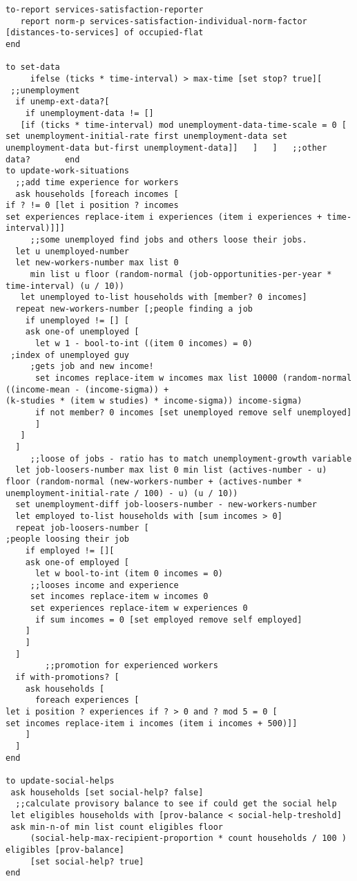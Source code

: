 \documentclass[english]{article}
\begin{document}
\begin{lstlisting}[basicstyle={\scriptsize}]
to-report services-satisfaction-reporter
   report norm-p services-satisfaction-individual-norm-factor [distances-to-services] of occupied-flat
end

to set-data
     ifelse (ticks * time-interval) > max-time [set stop? true][ 
 ;;unemployment
  if unemp-ext-data?[
    if unemployment-data != [] 
   [if (ticks * time-interval) mod unemployment-data-time-scale = 0 [
set unemployment-initial-rate first unemployment-data set unemployment-data but-first unemployment-data]]   ]   ]   ;;other data?       end
to update-work-situations
  ;;add time experience for workers
  ask households [foreach incomes [
if ? != 0 [let i position ? incomes
set experiences replace-item i experiences (item i experiences + time-interval)]]]
     ;;some unemployed find jobs and others loose their jobs.
  let u unemployed-number
  let new-workers-number max list 0 
     min list u floor (random-normal (job-opportunities-per-year * time-interval) (u / 10))
   let unemployed to-list households with [member? 0 incomes]
  repeat new-workers-number [;people finding a job
    if unemployed != [] [
    ask one-of unemployed [
      let w 1 - bool-to-int ((item 0 incomes) = 0)
 ;index of unemployed guy 
     ;gets job and new income!
      set incomes replace-item w incomes max list 10000 (random-normal ((income-mean - (income-sigma)) +
(k-studies * (item w studies) * income-sigma)) income-sigma)
      if not member? 0 incomes [set unemployed remove self unemployed]
      ] 
   ]
  ]
     ;;loose of jobs - ratio has to match unemployment-growth variable
  let job-loosers-number max list 0 min list (actives-number - u)
floor (random-normal (new-workers-number + (actives-number * unemployment-initial-rate / 100) - u) (u / 10))
  set unemployment-diff job-loosers-number - new-workers-number
  let employed to-list households with [sum incomes > 0]
  repeat job-loosers-number [
;people loosing their job
    if employed != [][
    ask one-of employed [
      let w bool-to-int (item 0 incomes = 0) 
     ;;looses income and experience 
     set incomes replace-item w incomes 0 
     set experiences replace-item w experiences 0
      if sum incomes = 0 [set employed remove self employed]
    ]
    ]
  ]
        ;;promotion for experienced workers
  if with-promotions? [
    ask households [
      foreach experiences [
let i position ? experiences if ? > 0 and ? mod 5 = 0 [
set incomes replace-item i incomes (item i incomes + 500)]]
    ]
  ] 
end

to update-social-helps 
 ask households [set social-help? false]
  ;;calculate provisory balance to see if could get the social help 
 let eligibles households with [prov-balance < social-help-treshold] 
 ask min-n-of min list count eligibles floor
     (social-help-max-recipient-proportion * count households / 100 ) eligibles [prov-balance]
     [set social-help? true]
end


\end{lstlisting}
\end{document}
